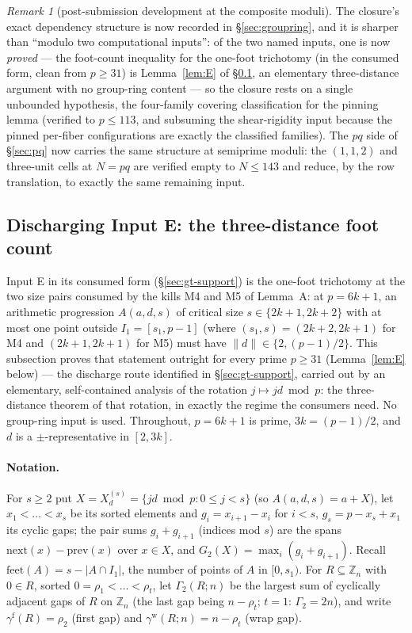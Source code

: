 \documentclass[11pt,a4paper]{article}
\numberwithin{equation}{section}
\theoremstyle{plain}
\theoremstyle{definition}
\theoremstyle{remark}
\newtheorem{remark}[theorem]{Remark}
\newcommand{\Z}{\mathbb{Z}}
\begin{document}
\begin{remark}[post-submission development at the composite moduli]
The closure's exact dependency structure is now recorded in
\S\ref{sec:groupring}, and it is sharper than ``modulo two computational
inputs'': of the two named inputs, one is now \emph{proved} --- the
foot-count inequality for the one-foot trichotomy (in the consumed form,
clean from $p\ge31$) is Lemma~\ref{lem:E} of \S\ref{sec:lemmaE}, an
elementary three-distance argument with no group-ring content --- so the
closure rests on a single unbounded hypothesis, the four-family covering
classification for the pinning lemma (verified to $p\le113$, and
subsuming the shear-rigidity input because the pinned per-fiber
configurations are exactly the classified families). The $pq$
side of \S\ref{sec:pq} now carries the same structure at semiprime moduli:
the $(1,1,2)$ and three-unit cells at $N=pq$ are verified empty to
$N\le143$ and reduce, by the row translation, to exactly the same
remaining input.
\end{remark}

\subsection{Discharging Input E: the three-distance foot count}\label{sec:lemmaE}

Input E in its consumed form (\S\ref{sec:gt-support}) is the one-foot
trichotomy at the two size pairs consumed by the kills M4 and M5 of
Lemma~A: at $p=6k+1$, an arithmetic progression $A(a,d,s)$ of critical
size $s\in\{2k{+}1,2k{+}2\}$ with at most one point outside
$I_1=[s_1,p-1]$ (where $(s_1,s)=(2k{+}2,2k{+}1)$ for M4 and
$(2k{+}1,2k{+}1)$ for M5) must have $\|d\|\in\{2,(p-1)/2\}$. This
subsection proves that statement outright for every prime $p\ge31$
(Lemma~\ref{lem:E} below) --- the discharge route identified in
\S\ref{sec:gt-support}, carried out by an elementary, self-contained
analysis of the rotation $j\mapsto jd\bmod p$: the three-distance
theorem of that rotation, in exactly the regime the consumers need. No
group-ring input is used. Throughout, $p=6k+1$ is prime, $3k=(p-1)/2$,
and $d$ is a $\pm$-representative in $[2,3k]$.

\paragraph{Notation.} For $s\ge2$ put
$X=X^{(s)}_d=\{jd\bmod p:0\le j<s\}$ (so $A(a,d,s)=a+X$), let
$x_1<\dots<x_s$ be its sorted elements and $g_i=x_{i+1}-x_i$ for $i<s$,
$g_s=p-x_s+x_1$ its cyclic gaps; the pair sums $g_i+g_{i+1}$ (indices
mod $s$) are the spans $\mathrm{next}(x)-\mathrm{prev}(x)$ over $x\in
X$, and $G_2(X)=\max_i(g_i+g_{i+1})$. Recall
$\mathrm{feet}(A)=s-|A\cap I_1|$, the number of points of $A$ in
$[0,s_1)$. For $R\subseteq\Z_n$ with $0\in R$, sorted
$0=\rho_1<\dots<\rho_t$, let $\Gamma_2(R;n)$ be the largest sum of
cyclically adjacent gaps of $R$ on $\Z_n$ (the last gap being
$n-\rho_t$; $t=1$: $\Gamma_2=2n$), and write
$\gamma^{\mathrm f}(R)=\rho_2$ (first gap) and
$\gamma^{\mathrm w}(R;n)=n-\rho_t$ (wrap gap).
\end{document}
